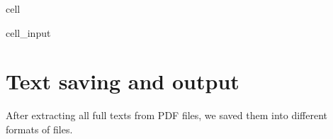 \documentclass[letterpaper,10pt,english]{jupyterBook}
\begin{document}
\begin{sphinxuseclass}{cell}\begin{sphinxVerbatimInput}

\begin{sphinxuseclass}{cell_input}
\begin{sphinxVerbatim}[commandchars=\\\{\}]
  \PYG{p}{[}\PYG{p}{]}
  \PYG{p}{[}\PYG{p}{]}

  
   

   
       
           
              
              
\end{sphinxVerbatim}

\end{sphinxuseclass}\end{sphinxVerbatimInput}

\end{sphinxuseclass}

\section{Text saving and output}
\label{\detokenize{ch30:text-saving-and-output}}
\sphinxAtStartPar
After extracting all full texts from PDF files, we saved them into different formats of files.
\end{document}
